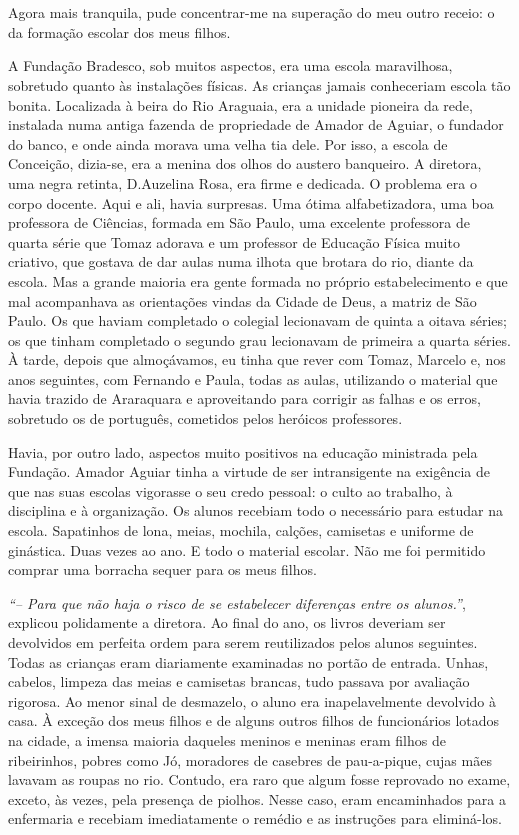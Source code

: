 \chapter{}
Agora mais tranquila, pude concentrar-me na superação do meu outro receio: o da formação escolar dos meus filhos.


A Fundação Bradesco, sob muitos aspectos, era uma escola maravilhosa, sobretudo quanto às instalações físicas.
As crianças jamais conheceriam escola tão bonita.
Localizada à beira do Rio Araguaia, era a unidade pioneira da rede, instalada numa antiga fazenda de propriedade de Amador de Aguiar, o fundador do banco, e onde ainda morava uma velha tia dele.
Por isso, a escola de Conceição, dizia-se, era a menina dos olhos do austero banqueiro.
A diretora, uma negra retinta, D.Auzelina Rosa, era firme e dedicada.
O problema era o corpo docente.
Aqui e ali, havia surpresas.
Uma ótima alfabetizadora, uma boa professora de Ciências, formada em São Paulo, uma excelente professora de quarta série que Tomaz adorava e um professor de Educação Física muito criativo, que gostava de dar aulas numa ilhota que brotara do rio, diante da escola.
Mas a grande maioria era gente formada no próprio estabelecimento e que mal acompanhava as orientações vindas da Cidade de Deus, a matriz de São Paulo.
Os que haviam completado o colegial lecionavam de quinta a oitava séries; os que tinham completado o segundo grau lecionavam de primeira a quarta séries.
À tarde, depois que almoçávamos, eu tinha que rever com Tomaz, Marcelo e, nos anos seguintes, com Fernando e Paula, todas as aulas, utilizando o material que havia trazido de Araraquara e aproveitando para corrigir as falhas e os erros, sobretudo os de português, cometidos pelos heróicos professores.

Havia, por outro lado, aspectos muito positivos na educação ministrada pela Fundação.
Amador Aguiar tinha a virtude de ser intransigente na exigência de que nas suas escolas vigorasse o seu credo pessoal: o culto ao trabalho, à disciplina e à organização.
Os alunos recebiam todo o necessário para estudar na escola.
Sapatinhos de lona, meias, mochila, calções, camisetas e uniforme de ginástica.
Duas vezes ao ano.
E todo o material escolar.
Não me foi permitido comprar uma borracha sequer para os meus filhos.

\textit{``-- Para que não haja o risco de se estabelecer diferenças entre os alunos.''}, explicou polidamente a diretora.
Ao final do ano, os livros deveriam ser devolvidos em perfeita ordem para serem reutilizados pelos alunos seguintes.
Todas as crianças eram diariamente examinadas no portão de entrada.
Unhas, cabelos, limpeza das meias e camisetas brancas, tudo passava por avaliação rigorosa.
Ao menor sinal de desmazelo, o aluno era inapelavelmente devolvido à casa.
À exceção dos meus filhos e de alguns outros filhos de funcionários lotados na cidade, a imensa maioria daqueles meninos e meninas eram filhos de ribeirinhos, pobres como Jó, moradores de casebres de pau-a-pique, cujas mães lavavam as roupas no rio.
Contudo, era raro que algum fosse reprovado no exame, exceto, às vezes, pela presença de piolhos.
Nesse caso, eram encaminhados para a enfermaria e recebiam imediatamente o remédio e as instruções para eliminá-los.

